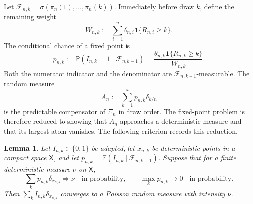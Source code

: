 \documentclass[11pt]{article}
\newtheorem{lemma}[theorem]{Lemma}
\theoremstyle{remark}
\theoremstyle{plain}
\newcommand{\E}{\mathbb E}
\newcommand{\Pp}{\mathbb P}
\newcommand{\one}{\mathbf 1}
\newcommand{\cF}{\mathcal F}
\begin{document}
Let $\cF_{n,k}=\sigma(\pi_n(1),\ldots,\pi_n(k))$.  Immediately before draw
$k$, define the remaining weight
\begin{equation}\label{eq:remaining-weight}
 W_{n,k}:=\sum_{i=1}^n\theta_{n,i}\one\{R_{n,i}\ge k\}.
\end{equation}
The conditional chance of a fixed point is
\begin{equation}\label{eq:predictable-p}
 p_{n,k}:=\Pp(I_{n,k}=1\mid\cF_{n,k-1})
 =\frac{\theta_{n,k}\one\{R_{n,k}\ge k\}}{W_{n,k}}.
\end{equation}
Both the numerator indicator and the denominator are
$\cF_{n,k-1}$-measurable.  The random measure
\begin{equation}\label{eq:compensator-measure}
 A_n:=\sum_{k=1}^n p_{n,k}\delta_{k/n}
\end{equation}
is the predictable compensator of $\Xi_n$ in draw order.  The fixed-point
problem is therefore reduced to showing that $A_n$ approaches a deterministic
measure and that its largest atom vanishes.  The following criterion records
this reduction.

\begin{lemma}\label{lem:predictable-poisson}
Let $I_{n,k}\in\{0,1\}$ be adapted, let $x_{n,k}$ be deterministic points in
a compact space $\mathsf X$, and let
$p_{n,k}=\E(I_{n,k}\mid\cF_{n,k-1})$.  Suppose that for a finite deterministic
measure $\nu$ on $\mathsf X$,
\begin{equation}\label{eq:poisson-criterion}
 \sum_kp_{n,k}\delta_{x_{n,k}}\Longrightarrow\nu
 \quad\text{in probability},
 \qquad
 \max_kp_{n,k}\longrightarrow0
 \quad\text{in probability}.
\end{equation}
Then $\sum_k I_{n,k}\delta_{x_{n,k}}$ converges to a Poisson random measure
with intensity $\nu$.
\end{lemma}
\end{document}
